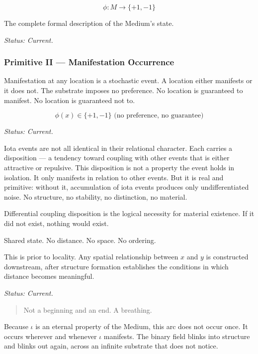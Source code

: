 \documentclass[11pt,letterpaper]{article}
\begin{document}
\begin{equation}
\phi : M \to \{+1, -1\}
\end{equation}

\begin{center}
The complete formal description of the Medium's state.
\end{center}

\emph{Status: Current.}
\subsubsection{Primitive II --- Manifestation Occurrence}
\label{sec:orgb542b75}

Manifestation at any location is a stochastic event. A location either manifests or it does not. The substrate imposes no preference. No location is guaranteed to manifest. No location is guaranteed not to.

\begin{equation}
\phi(x) \in \{+1, -1\} \text{ (no preference, no guarantee)}
\end{equation}

\emph{Status: Current.}

Iota events are not all identical in their relational character. Each carries a disposition — a tendency toward coupling with other events that is either attractive or repulsive.
This disposition is not a property the event holds in isolation. It only manifests in relation to other events. But it is real and primitive: without it, accumulation of iota events produces only undifferentiated noise. No structure, no stability, no distinction, no material.

Differential coupling disposition is the logical necessity for material existence. If it did not exist, nothing would exist.

\begin{center}
Shared state. No distance. No space. No ordering.
\end{center}

This is prior to locality. Any spatial relationship between \(x\) and \(y\) is constructed downstream, after structure formation establishes the conditions in which distance becomes meaningful.

\emph{Status: Current.}

\begin{quote}
Not a beginning and an end. A breathing.
\end{quote}

Because \(\iota\) is an eternal property of the Medium, this arc does not occur once. It occurs wherever and whenever \(\iota\) manifests. The binary field blinks into structure and blinks out again, across an infinite substrate that does not notice.
\end{document}

